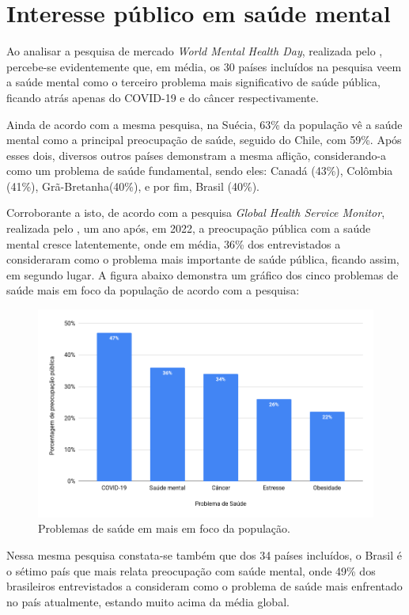 \section{Interesse público em saúde mental}
\label{sec:interessePublico}

Ao analisar a pesquisa de mercado \textit{World Mental Health Day}, realizada pelo , percebe-se evidentemente que, em média, os 30 países incluídos na pesquisa veem a saúde mental como o terceiro problema mais significativo de saúde pública, ficando atrás apenas do COVID-19 e do câncer respectivamente.

Ainda de acordo com a mesma pesquisa, na Suécia, 63\% da população vê a saúde mental como a principal preocupação de saúde, seguido do Chile, com 59\%. Após esses dois, diversos outros países demonstram a mesma aflição, considerando-a como um problema de saúde fundamental, sendo eles: Canadá (43\%), Colômbia (41\%), Grã-Bretanha(40\%), e por fim, Brasil (40\%).

Corroborante a isto, de acordo com a pesquisa \textit{Global Health Service Monitor}, realizada pelo , um ano após, em 2022, a preocupação pública com a saúde mental cresce latentemente, onde em média, 36\% dos entrevistados a consideraram como o problema mais importante de saúde pública, ficando assim, em segundo lugar. A figura abaixo demonstra um gráfico dos cinco problemas de saúde mais em foco da população de acordo com a pesquisa:

\begin{figure}[H]
    \centering
    \caption{Problemas de saúde em mais em foco da população.}
    \label{fig:interessePublicoImg}
    \includegraphics[width=.8\textwidth]{data/figures/interesse-publico.png}
\end{figure}

Nessa mesma pesquisa constata-se também que dos 34 países incluídos, o Brasil é o sétimo país que mais relata preocupação com saúde mental, onde 49\% dos brasileiros entrevistados a consideram como o problema de saúde mais enfrentado no país atualmente, estando muito acima da média global.
